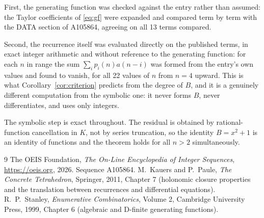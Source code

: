 \documentclass[11pt,a4paper]{article}
\theoremstyle{plain}
\theoremstyle{definition}
\begin{document}
First, the generating function was checked against the entry rather than assumed: the
Taylor coefficients of \eqref{eq:gf} were expanded and compared term by term with the DATA
section of A105864, agreeing on all 13 terms compared.

Second, the recurrence itself was evaluated directly on the published terms, in exact
integer arithmetic and without reference to the generating function: for each $n$ in range
the sum $\sum_{i}p_{i}(n)a(n-i)$ was formed from the entry's own values and found to
vanish, for all 22 values of $n$ from $n=4$ upward. This is what
Corollary~\ref{cor:criterion} predicts from the degree of $B$, and it is a genuinely
different computation from the symbolic one: it never forms $B$, never differentiates, and
uses only integers.

The symbolic step is exact throughout. The residual is obtained by rational-function
cancellation in $K$, not by series truncation, so the identity $B=x^{2} + 1$ is an
identity of functions and the theorem holds for all $n>2$ simultaneously.

\begin{thebibliography}{9}
 The OEIS Foundation, \emph{The On-Line Encyclopedia of Integer Sequences},
\url{https://oeis.org}, 2026. Sequence A105864.
 M.~Kauers and P.~Paule, \emph{The Concrete Tetrahedron}, Springer, 2011,
Chapter 7 (holonomic closure properties and the translation between recurrences and
differential equations).
 R.~P.~Stanley, \emph{Enumerative Combinatorics}, Volume 2, Cambridge
University Press, 1999, Chapter 6 (algebraic and D-finite generating functions).
\end{thebibliography}
\end{document}
